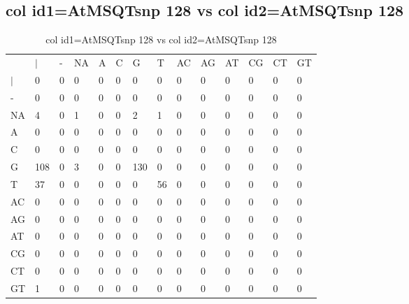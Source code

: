 \subsection{col id1=AtMSQTsnp 128 vs col id2=AtMSQTsnp 128}
\begin{center}
\begin{longtable}{|l|l|l|l|l|l|l|l|l|l|l|l|l|l|}
\caption{col id1=AtMSQTsnp 128 vs col id2=AtMSQTsnp 128} \label{table_dm710}\\
\hline
\\
\hline
&$|$&-&NA&A&C&G&T&AC&AG&AT&CG&CT&GT\\
$|$&0&0&0&0&0&0&0&0&0&0&0&0&0\\
-&0&0&0&0&0&0&0&0&0&0&0&0&0\\
NA&4&0&1&0&0&2&1&0&0&0&0&0&0\\
A&0&0&0&0&0&0&0&0&0&0&0&0&0\\
C&0&0&0&0&0&0&0&0&0&0&0&0&0\\
G&108&0&3&0&0&130&0&0&0&0&0&0&0\\
T&37&0&0&0&0&0&56&0&0&0&0&0&0\\
AC&0&0&0&0&0&0&0&0&0&0&0&0&0\\
AG&0&0&0&0&0&0&0&0&0&0&0&0&0\\
AT&0&0&0&0&0&0&0&0&0&0&0&0&0\\
CG&0&0&0&0&0&0&0&0&0&0&0&0&0\\
CT&0&0&0&0&0&0&0&0&0&0&0&0&0\\
GT&1&0&0&0&0&0&0&0&0&0&0&0&0\\
\hline
\end{longtable}
\end{center}

